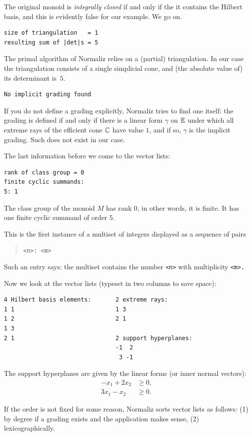 The original monoid is \emph{integrally closed} if and only if the it contains the Hilbert basis, and this is evidently false for our example. We go on.

\begin{Verbatim}
size of triangulation   = 1
resulting sum of |det|s = 5
\end{Verbatim}
The primal algorithm of Normaliz relies on a (partial) triangulation. In our case the triangulation consists of a single simplicial cone, and (the absolute value of) its determinant is~$5$.
\begin{Verbatim}
No implicit grading found
\end{Verbatim}
If you do not define a grading explicitly, Normaliz tries to find one itself: the grading is defined if and only if there is a linear form $\gamma$ on ${\mathbb E}$ under which all extreme rays of the efficient cone ${\mathbb C}$ have value $1$, and if so, $\gamma$ is the implicit grading. Such does not exist in our case.

The last information before we come to the vector lists:
\begin{Verbatim}
rank of class group = 0
finite cyclic summands:
5: 1  
\end{Verbatim}
The class group of the monoid $M$ has rank $0$, in other words, it is finite. It has one finite cyclic summand of order $5$.

This is the first instance of a multiset of integers displayed as a sequence of pairs
\begin{quote}
	\verb|<n>: <m>|
\end{quote}
Such an entry says: the multiset contains the number \verb|<n>| with multiplicity \verb|<m>.|


Now we look at the vector lists (typeset in two columns to save space):
\begin{Verbatim}
4 Hilbert basis elements:       2 extreme rays:
1 1                             1 3
1 2                             2 1
1 3
2 1                             2 support hyperplanes:
                                -1  2
                                 3 -1
\end{Verbatim}

The support hyperplanes are given by the linear forms (or inner normal vectors):
\begin{align*}
-x_1+2x_2&\ge 0,\\
3x_1-x_2&\ge 0.
\end{align*}

If the order is not fixed for some reason, Normaliz sorts vector lists as follows: (1) by degree if a grading exists and the application makes sense, (2) lexicographically.


